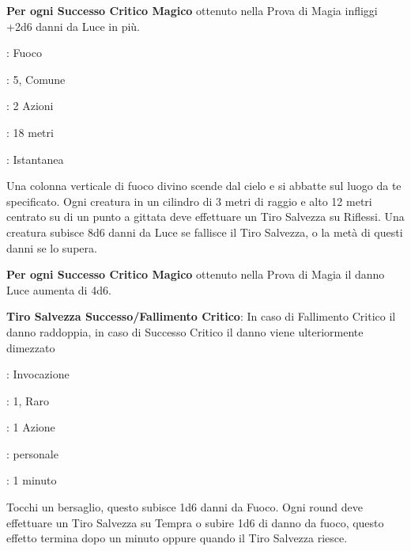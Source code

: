 \begin{multicols}{2}
\textbf{Per ogni Successo Critico Magico} ottenuto nella Prova di Magia infliggi +2d6 danni da Luce in più.

\noindent\colorbox{OBSSgold!10}{
\begin{minipage}{0.95\linewidth}
\begin{description}[noitemsep, topsep=0pt, parsep=0pt, partopsep=0pt, leftmargin=0cm, labelwidth=1.3cm]
	\item[\textbf{Lista}]: Fuoco
	\item[\textbf{Livello}]: 5, Comune
	\item[\textbf{Lancio}]: 2 Azioni
	\item[\textbf{Gittata}]: 18 metri
	\item[\textbf{Durata}]: Istantanea
\end{description}
\end{minipage}}\smallskip

Una colonna verticale di fuoco divino scende dal cielo e si abbatte sul luogo da te specificato. Ogni creatura in un cilindro di 3 metri di raggio e alto 12 metri centrato su di un punto a gittata deve effettuare un Tiro Salvezza su Riflessi. Una creatura subisce 8d6 danni da Luce se fallisce il Tiro Salvezza, o la metà di questi danni se lo supera.

\textbf{Per ogni Successo Critico Magico} ottenuto nella Prova di Magia il danno Luce aumenta di 4d6.

\textbf{Tiro Salvezza Successo/Fallimento Critico}: In caso di Fallimento Critico il danno raddoppia, in caso di Successo Critico il danno viene ulteriormente dimezzato

\noindent\colorbox{OBSSgold!10}{
\begin{minipage}{0.95\linewidth}
\begin{description}[noitemsep, topsep=0pt, parsep=0pt, partopsep=0pt, leftmargin=0cm, labelwidth=1.3cm]
	\item[\textbf{Lista}]: Invocazione
	\item[\textbf{Livello}]: 1, Raro
	\item[\textbf{Lancio}]: 1 Azione
	\item[\textbf{Gittata}]: personale
	\item[\textbf{Durata}]: 1 minuto
\end{description}
\end{minipage}}\smallskip

Tocchi un bersaglio, questo subisce 1d6 danni da Fuoco. Ogni round deve effettuare un Tiro Salvezza su Tempra o subire 1d6 di danno da fuoco, questo effetto termina dopo un minuto oppure quando il Tiro Salvezza riesce.


\end{multicols}
